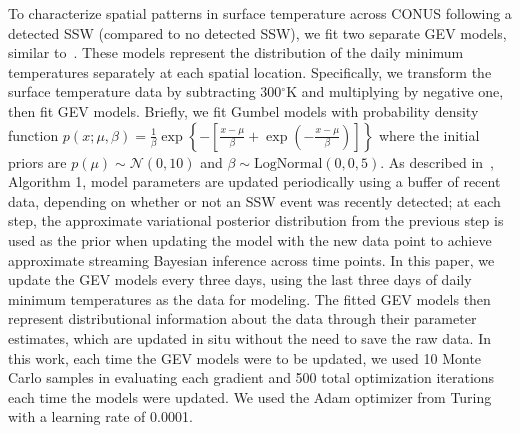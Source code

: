 \documentclass{juliacon}
\begin{document}
To characterize spatial patterns in surface temperature across CONUS following a detected SSW (compared to no detected SSW), we fit two separate GEV models, similar to~\cite{ssw_isav}. These models represent the distribution of the daily minimum temperatures separately at each spatial location. Specifically, we transform the surface temperature data by subtracting 300$^\circ$K and multiplying by negative one, then fit GEV models. Briefly, we fit Gumbel models with probability density function $p(x; \mu, \beta) = \frac{1}{\beta}\exp \left\{ -\left[ \frac{x-\mu}{\beta}+\exp\left( -\frac{x-\mu}{\beta}\right)\right] \right\}$ where the initial priors are $p(\mu) \sim \mathcal{N}(0, 10)$ and $\beta \sim \text{LogNormal}(0, 0,5)$. As described in~\cite{ssw_isav}, Algorithm 1, model parameters are updated periodically using a buffer of recent data, depending on whether or not an SSW event was recently detected; at each step, the approximate variational posterior distribution from the previous step is used as the prior when updating the model with the new data point to achieve approximate streaming Bayesian inference across time points. In this paper, we update the GEV models every three days, using the last three days of daily minimum temperatures as the data for modeling. The fitted GEV models then represent distributional information about the data through their parameter estimates, which are updated in situ without the need to save the raw data. In this work, each time the GEV models were to be updated, we used 10 Monte Carlo samples in evaluating each gradient and 500 total optimization iterations each time the models were updated. We used the Adam optimizer from Turing~\cite{ge2018turing} with a learning rate of 0.0001. 
\end{document}
